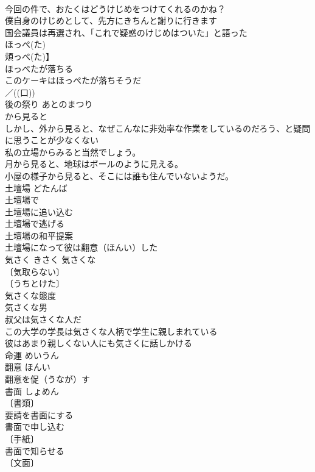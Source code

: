 \documentclass[8pt]{extreport}
\begin{document}
\begin{CJK}{UTF8}{min}
\\	今回の件で、おたくはどうけじめをつけてくれるのかね？ 
\\	僕自身のけじめとして、先方にきちんと謝りに行きます 
\\	国会議員は再選され、「これで疑惑のけじめはついた」と語った 
\\	ほっぺ(た)	
\\	頬っぺ(た)】	
\\	ほっぺたが落ちる 
\\	このケーキはほっぺたが落ちそうだ 
\\	／((口)) 
\\	後の祭り	あとのまつり	
\\	から見ると		
\\	しかし、外から見ると、なぜこんなに非効率な作業をしているのだろう、と疑問に思うことが少なくない 
\\	私の立場からみると当然でしょう。 
\\	月から見ると、地球はボールのように見える。 
\\	小屋の様子から見ると、そこには誰も住んでいないようだ。 
\\	土壇場	どたんば	
\\	土壇場で 
\\	土壇場に追い込む 
\\	土壇場で逃げる 
\\	土壇場の和平提案 
\\	土壇場になって彼は翻意（ほんい）した 
\\	気さく	きさく	気さくな 
\\	〔気取らない〕
\\	〔うちとけた〕
\\	気さくな態度 
\\	気さくな男 
\\	叔父は気さくな人だ 
\\	この大学の学長は気さくな人柄で学生に親しまれている 
\\	彼はあまり親しくない人にも気さくに話しかける 
\\	命運	めいうん	
\\	翻意	ほんい	
\\	翻意を促（うなが）す 
\\	書面	しょめん	
\\	〔書類〕
\\	要請を書面にする 
\\	書面で申し込む 
\\	〔手紙〕
\\	書面で知らせる 
\\	〔文面〕

\end{CJK}
\end{document}
